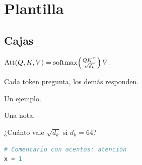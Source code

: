 \documentclass[11pt,letterpaper,oneside]{report}
\begin{document}
\portada
\tableofcontents
\setcounter{chapter}{-1}
\chapter{Plantilla}
\section{Cajas}
\begin{definicion}[Atención]
$\operatorname{Att}(Q,K,V)=\operatorname{softmax}\!\left(\frac{QK^\top}{\sqrt{d_k}}\right)V$.
\end{definicion}
\begin{intuicion}Cada token pregunta, los demás responden.\end{intuicion}
\begin{ejemplo}Un ejemplo.\end{ejemplo}
\begin{nota}Una nota.\end{nota}
\begin{ejercicio}¿Cuánto vale $\sqrt{d_k}$ si $d_k=64$?\end{ejercicio}
\begin{lstlisting}[language=Python]
# Comentario con acentos: atención
x = 1
\end{lstlisting}
\end{document}
